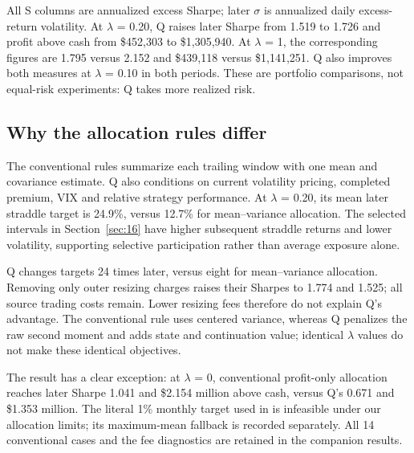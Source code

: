 All S columns are annualized excess Sharpe; later \(\sigma\) is annualized daily excess-return volatility. At \(\lambda\) = 0.20, Q raises later Sharpe from 1.519 to 1.726 and profit above cash from \$452,303 to \$1,305,940. At \(\lambda\) = 1, the corresponding figures are 1.795 versus 2.152 and \$439,118 versus \$1,141,251. Q also improves both measures at \(\lambda\) = 0.10 in both periods. These are portfolio comparisons, not equal-risk experiments: Q takes more realized risk.


\subsection*{Why the allocation rules differ}

The conventional rules summarize each trailing window with one mean and covariance estimate. Q also conditions on current volatility pricing, completed premium, VIX and relative strategy performance. At \(\lambda\) = 0.20, its mean later straddle target is 24.9\%, versus 12.7\% for mean--variance allocation. The selected intervals in Section~\ref{sec:16} have higher subsequent straddle returns and lower volatility, supporting selective participation rather than average exposure alone.


Q changes targets 24 times later, versus eight for mean--variance allocation. Removing only outer resizing charges raises their Sharpes to 1.774 and 1.525; all source trading costs remain. Lower resizing fees therefore do not explain Q's advantage. The conventional rule uses centered variance, whereas Q penalizes the raw second moment and adds state and continuation value; identical \(\lambda\) values do not make these identical objectives.


The result has a clear exception: at \(\lambda\) = 0, conventional profit-only allocation reaches later Sharpe 1.041 and \$2.154 million above cash, versus Q's 0.671 and \$1.353 million. The literal 1\% monthly target used in \cite{caner2026} is infeasible under our allocation limits; its maximum-mean fallback is recorded separately. All 14 conventional cases and the fee diagnostics are retained in the companion results.
